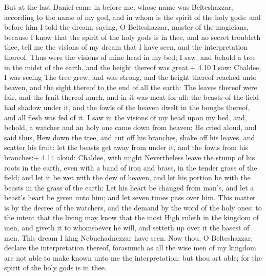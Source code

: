  But at the last Daniel came in before me, whose name was
Belteshazzar, according to the name of my god, and in whom is the spirit
of the holy gods: and before him I told the dream, saying, 
O Belteshazzar, master of the magicians, because I know that the spirit
of the holy gods is in thee, and no secret troubleth thee, tell me the
visions of my dream that I have seen, and the interpretation thereof.
 Thus were the visions of mine head in my bed; I saw, and
behold a tree in the midst of the earth, and the height thereof was
great.+ 4.10 I saw: Chaldee, I was seeing  The tree grew,
and was strong, and the height thereof reached unto heaven, and the
sight thereof to the end of all the earth:  The leaves
thereof were fair, and the fruit thereof much, and in it was meat for
all: the beasts of the field had shadow under it, and the fowls of the
heaven dwelt in the boughs thereof, and all flesh was fed of it.
 I saw in the visions of my head upon my bed, and, behold,
a watcher and an holy one came down from heaven;  He cried
aloud, and said thus, Hew down the tree, and cut off his branches, shake
off his leaves, and scatter his fruit: let the beasts get away from
under it, and the fowls from his branches:+ 4.14 aloud: Chaldee, with
might  Nevertheless leave the stump of his roots in the
earth, even with a band of iron and brass, in the tender grass of the
field; and let it be wet with the dew of heaven, and let his portion be
with the beasts in the grass of the earth:  Let his heart
be changed from man's, and let a beast's heart be given unto him; and
let seven times pass over him.  This matter is by the
decree of the watchers, and the demand by the word of the holy ones: to
the intent that the living may know that the most High ruleth in the
kingdom of men, and giveth it to whomsoever he will, and setteth up over
it the basest of men.  This dream I king Nebuchadnezzar
have seen. Now thou, O Belteshazzar, declare the interpretation thereof,
forasmuch as all the wise men of my kingdom are not able to make known
unto me the interpretation: but thou art able; for the spirit of the
holy gods is in thee.

